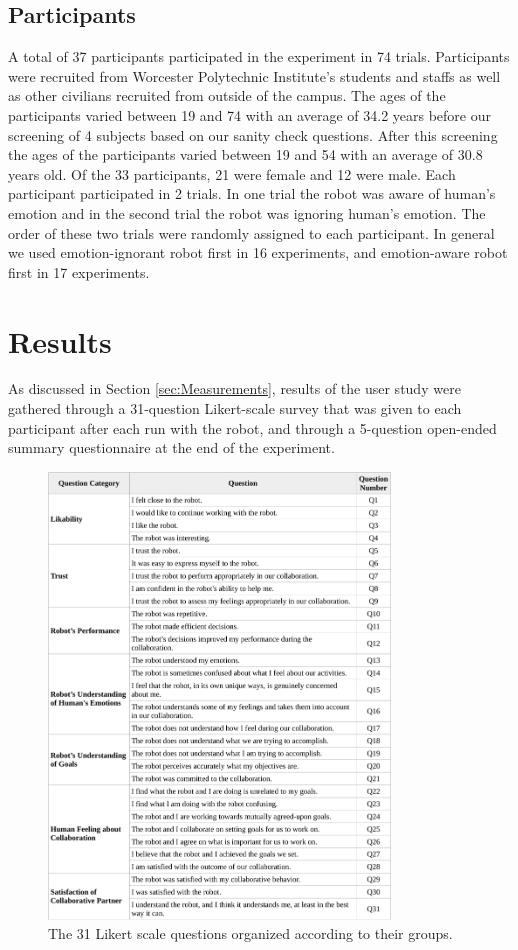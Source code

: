 \documentclass[12pt]{report}
\begin{document}
\subsection{Participants}
\label{sec:Participants}
A total of 37 participants participated in the experiment in 74 trials.
Participants were recruited from Worcester Polytechnic Institute's students and
staffs as well as other civilians recruited from outside of the campus. The ages
of the participants varied between 19 and 74 with an average of 34.2 years
before our screening of 4 subjects based on our sanity check questions. After
this screening the ages of the participants varied between 19 and 54 with an
average of 30.8 years old. Of the 33 participants, 21 were female and 12
were male. Each participant participated in 2 trials. In one trial the robot was
aware of human's emotion and in the second trial the robot was ignoring human's
emotion. The order of these two trials were randomly assigned to each
participant. In general we used emotion-ignorant robot first in 16 experiments,
and emotion-aware robot first in 17 experiments.

\section{Results}

As discussed in Section \ref{sec:Measurements}, results of the user study were
gathered through a 31-question Likert-scale survey that was given to each
participant after each run with the robot, and through a 5-question open-ended
summary questionnaire at the end of the experiment.

\begin{figure}[h]
\centering
\includegraphics[width=0.81\textwidth]{figure/table1-croped.pdf}
\caption{\fontsize{10pt}{10pt}\selectfont The 31 Likert scale questions
organized according to their groups.}
\label{fig:31questions-table}
\end{figure}
\end{document}
